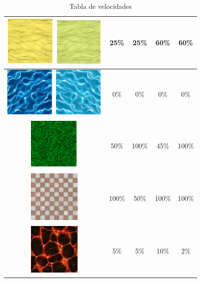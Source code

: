 \begin{table}[H]
\begin{tabular}{|c|c|c|c|c|}
        \hline
        \includegraphics{imagesTable/arena} \includegraphics{imagesTable/claroArena} & 25\% & 25\% & 60\% & 60\% \\
        \hline
        \includegraphics{imagesTable/agua} \includegraphics{imagesTable/claroAgua} & 0\% & 0\% & 0\% & 0\% \\
        \hline
        \includegraphics{imagesTable/hierba} & 50\% & 100\% & 45\% & 100\% \\
        \hline
        \includegraphics[scale=0.5]{imagesTable/suelo} & 100\% & 50\% & 100\% & 100\% \\
        \hline
        \includegraphics{imagesTable/lava} & 5\% & 5\% & 10\% & 2\% \\
        \hline
    \end{tabular}
    \caption{Tabla de velocidades}
\end{table}


